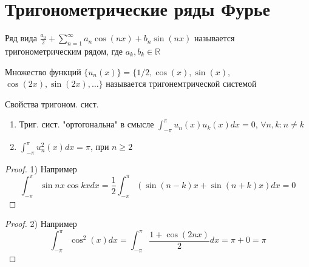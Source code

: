 \documentclass{article}
\theoremstyle{definition}
\numberwithin{theorem}{section}
\numberwithin{lemma}{section}
\numberwithin{definition}{section}
\numberwithin{corollary}{section}
\numberwithin{equation}{section}
\newcommand\R{\ensuremath{\mathbb{R}}}
\begin{document}
\section{Тригонометрические ряды Фурье}
\begin{definition}
  Ряд вида $\frac{a_0}{2}+\sum_{n=1}^{\infty}a_n\cos(nx)+b_n\sin(nx)$
  называется тригонометрическим рядом, где $a_k,b_k\in\R$
\end{definition}
\begin{definition}
  Множество функций $\{u_n(x)\}=\{1/2, \cos(x), \sin(x),$ $ \cos(2x), \sin(2x),\dots\} $
  называется тригонемтрической системой
\end{definition}
Свойства тригоном. сист.
\begin{enumerate}
  \item Триг. сист. "ортогональна" в смысле $\int_{-\pi}^{\pi}u_n(x)u_k(x)dx=0$,
    $\forall n,k:n\neq k$
  \item $\int_{-\pi}^{\pi}u_n^{2}(x)dx=\pi$, при $n \ge 2$
\end{enumerate}
\begin{proof} 1) Например
      \[
        \int_{-\pi}^{\pi}\sin nx \cos kx dx = 
        \frac{1}{2}\int_{-\pi}^{\pi}(\sin(n-k)x+\sin(n+k)x)dx=0
      \]
\end{proof}
\begin{proof} 2)
  Например \[
    \int_{-\pi}^{\pi}\cos^{2}(x)dx=\int_{-\pi}^{\pi}\frac{1+\cos(2nx)}{2}dx=\pi + 0=\pi
  \]
\end{proof}
\end{document}
